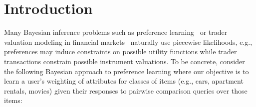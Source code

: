 \section{Introduction}

Many Bayesian inference problems such as preference
learning~\cite{sanner:aistats10} or trader valuation modeling in
financial markets~\cite{Shogren:00} naturally use piecewise
likelihoods, e.g., preferences may induce
constraints on possible utility functions while trader transactions
constrain possible instrument valuations.  To be concrete, consider
the following Bayesian approach to preference learning where our
objective is to learn a user's weighting of attributes for
classes of items (e.g., cars, apartment rentals, movies) given their
responses to pairwise comparison queries over those items:

